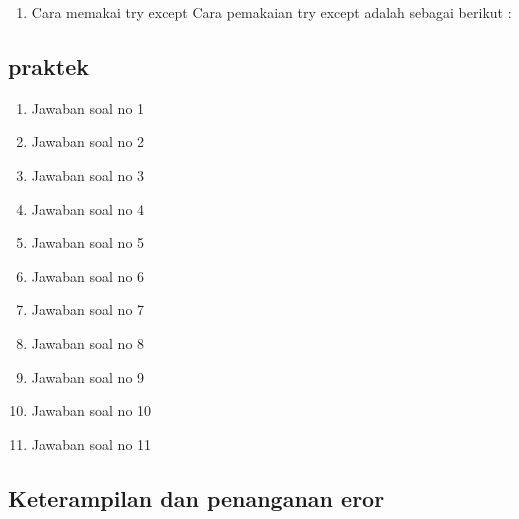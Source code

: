 \begin{enumerate}
\begin{enumerate}
    \item Cara memakai try except
Cara pemakaian try except adalah sebagai berikut :


\end{enumerate}

\subsection{praktek}
\begin{enumerate}
    \item Jawaban soal no 1
    
    \item Jawaban soal no 2
    
    \item Jawaban soal no 3
    
    \item Jawaban soal no 4
    
    \item Jawaban soal no 5
    
    \item Jawaban soal no 6
    
    \item Jawaban soal no 7
    
    \item Jawaban soal no 8
    
    \item Jawaban soal no 9
    
    \item Jawaban soal no 10
    
    \item Jawaban soal no 11
    
\end{enumerate}

\subsection{Keterampilan dan penanganan eror}
    


\end{enumerate}

